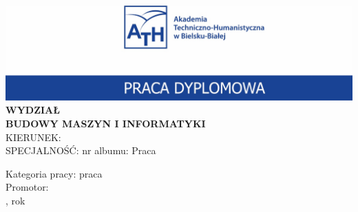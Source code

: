 {
\centering
\includegraphics{imgs/Nagłówek.jpg}
\Large
\textbf{
    \MakeUppercase{Wydział} \\
    \MakeUppercase{budowy maszyn i informatyki}
}\\
\MakeUppercase{KIERUNEK:} \textbf{\kierunek} \\
\MakeUppercase{SPECJALNOŚĆ:} \textbf{\specjalnosc}
\vfill
\MakeUppercase{\textbf{\autor}}
\vfill
\normalsize
nr albumu: \nralbumu
\vfill
\large
Praca \typpracy
\vfill
\Large
\begin{center} \textbf{\temat} \end{center}
\vspace{3cm}
\large
Kategoria pracy: praca \kategoriapracy \\
\Large
Promotor: \promotortytul\ \MakeUppercase{\promotor}\\
\vfill
\normalsize
\miejscowosc, rok \rokakademicki
\vfill
}